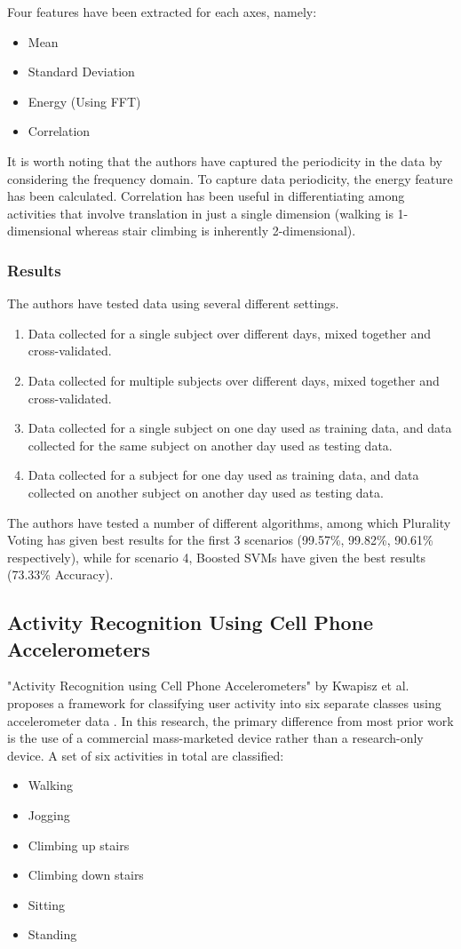 Four features have been extracted for each axes, namely:

\begin{itemize}
\item{Mean}
\item{Standard Deviation}
\item{Energy (Using FFT)}
\item{Correlation}
\end{itemize}

It is worth noting that the authors have captured the periodicity in the data by considering the frequency domain. To capture data periodicity, the energy feature has been calculated.  Correlation has been useful in differentiating among activities that involve translation in just a single dimension (walking is 1-dimensional whereas stair climbing is inherently 2-dimensional).

\subsubsection{Results}
The authors have tested data using several different settings.
\begin{enumerate}
\item{Data collected for a single subject over different days, mixed together and cross-validated.}
\item{Data collected for multiple subjects over different days, mixed together and cross-validated.}
\item{Data collected for a single subject on one day used as training data, and data collected for the same subject on another day used as testing data.}
\item{Data collected for a subject for one day used as training data, and data collected on another subject on another day used as testing data.}
\end{enumerate}

The authors have tested a number of different algorithms, among which Plurality Voting has given best results for the first 3 scenarios (99.57\%, 99.82\%, 90.61\% respectively), while for scenario 4, Boosted SVMs have given the best results (73.33\% Accuracy).


\subsection{Activity Recognition Using Cell Phone Accelerometers}
"Activity Recognition using Cell Phone Accelerometers" by Kwapisz et al. proposes a framework for classifying user activity into six separate classes using accelerometer data \cite{Kwapisz11}. In this research, the primary difference from most prior work is the use of a commercial mass-marketed device rather than a research-only device. A set of six activities in total are classified:
\begin{itemize} 
\item{Walking}
\item{Jogging}
\item{Climbing up stairs}
\item{Climbing down stairs}
\item{Sitting}
\item{Standing}
\end{itemize}

